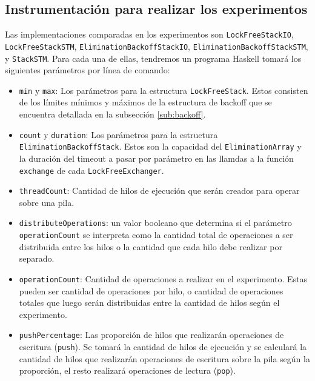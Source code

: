 \subsection{Instrumentación para realizar los experimentos}
Las implementaciones comparadas en los experimentos son \texttt{LockFreeStackIO}, \texttt{LockFreeStackSTM}, \texttt{EliminationBackoffStackIO}, \texttt{EliminationBackoffStackSTM}, y \texttt{StackSTM}. Para cada una de ellas, tendremos un programa Haskell tomará los siguientes parámetros por línea de comando:

\begin{itemize}
    \item \texttt{min} y \texttt{max}: Los parámetros para la estructura \texttt{LockFreeStack}. Estos consisten de los límites mínimos y máximos de la estructura de backoff que se encuentra detallada en la subsección \ref{sub:backoff}.
    \item \texttt{count} y \texttt{duration}: Los parámetros para la estructura \texttt{EliminationBackoffStack}. Estos son la capacidad del \texttt{EliminationArray} y la duración del timeout a pasar por parámetro en las llamdas a la función \texttt{exchange} de cada \texttt{LockFreeExchanger}.
    \item \texttt{threadCount}: Cantidad de hilos de ejecución que serán creados para operar sobre una pila.
    \item \texttt{distributeOperations}: un valor booleano que determina si el parámetro \texttt{operationCount} se interpreta como la cantidad total de operaciones a ser distribuida entre los hilos o la cantidad que cada hilo debe realizar por separado.
    \item \texttt{operationCount}: Cantidad de operaciones a realizar en el experimento. Estas pueden ser cantidad de operaciones por hilo, o cantidad de operaciones totales que luego serán distribuidas entre la cantidad de hilos según el experimento.
    \item \texttt{pushPercentage}: Las proporción de hilos que realizarán operaciones de escritura (\texttt{push}). Se tomará la cantidad de hilos de ejecución y se calculará la cantidad de hilos que realizarán operaciones de escritura sobre la pila según la proporción, el resto realizará operaciones de lectura (\texttt{pop}).
\end{itemize}

